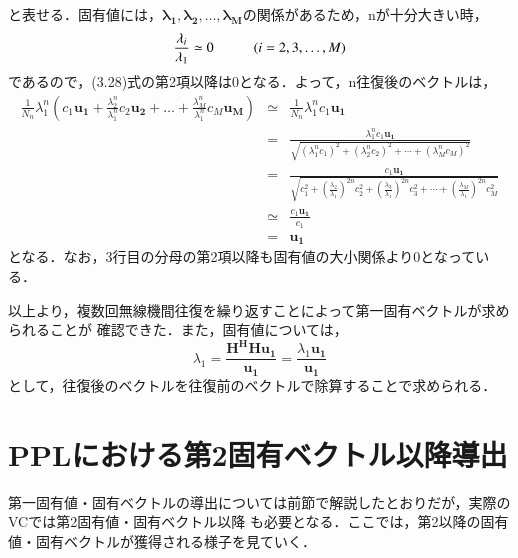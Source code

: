 と表せる．固有値には，$\bm{\lambda_1},\bm{\lambda_2},\ldots,\bm{\lambda_M}$の関係があるため，nが十分大きい時，
\begin{equation}
    \frac{\lambda_i}{\lambda_1} \simeq 0 \hspace{10mm} (i=2,3,\ldots,M)
\end{equation}
であるので，(3.28)式の第2項以降は0となる．よって，n往復後のベクトルは，
\begin{eqnarray}
    \frac{1}{N_n}\lambda_1^n\left(
        c_1\bm{u_1}+\frac{\lambda_2^n}{\lambda_1^n}c_2\bm{u_2}+\ldots+\frac{\lambda_M^n}{\lambda_1^n}c_M\bm{u_M}
    \right) &\simeq& \frac{1}{N_n}\lambda_1^nc_1\bm{u_1} \nonumber \\
    &=& \frac{\lambda_1^nc_1\bm{u_1}}{\sqrt{(\lambda_1^nc_1)^2+(\lambda_2^nc_2)^2+\cdots+(\lambda_M^nc_M)^2}} \nonumber \\
    &=& \frac{c_1\bm{u_1}}{\sqrt{ c_1^2 + \left(\frac{\lambda_2}{\lambda_1}\right)^{2n}c_2^2+\left(\frac{\lambda_3}{\lambda_1}\right)^{2n}c_3^2+\cdots+\left(\frac{\lambda_M}{\lambda_1}\right)^{2n}c_M^2}} \nonumber \\
    &\simeq& \frac{c_1\bm{u_1}}{c_1} \nonumber \\
    &=& \bm{u_1}
\end{eqnarray}
となる．なお，3行目の分母の第2項以降も固有値の大小関係より0となっている．

以上より，複数回無線機間往復を繰り返すことによって第一固有ベクトルが求められることが
確認できた．また，固有値については，
\begin{equation}
    \lambda_1 = \frac{\bm{H^HHu_1}}{\bm{u_1}} = \frac{\lambda_1\bm{u_1}}{\bm{u_1}}
\end{equation}
として，往復後のベクトルを往復前のベクトルで除算することで求められる．

\section{PPLにおける第2固有ベクトル以降導出}
第一固有値・固有ベクトルの導出については前節で解説したとおりだが，実際のVCでは第2固有値・固有ベクトル以降
も必要となる．ここでは，第2以降の固有値・固有ベクトルが獲得される様子を見ていく．


